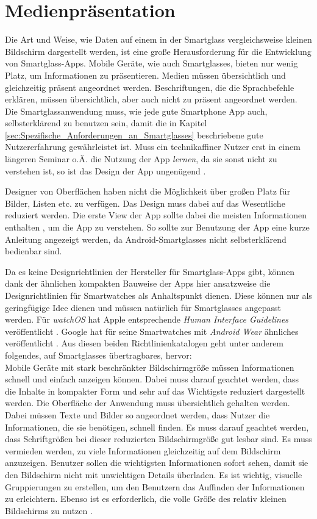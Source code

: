 \section{Medienpräsentation}
\label{sec:Medienpraesentation}
Die Art und Weise, wie Daten auf einem in der Smartglass vergleichsweise kleinen Bildschirm dargestellt werden, ist eine große Herausforderung für die Entwicklung von Smartglass-Apps. Mobile Geräte, wie auch Smartglasses, bieten nur wenig Platz, um Informationen zu präsentieren. Medien müssen übersichtlich und gleichzeitig präsent angeordnet werden. Beschriftungen, die die Sprachbefehle erklären, müssen übersichtlich, aber auch nicht zu präsent angeordnet werden. Die Smartglassanwendung muss, wie jede gute Smartphone App auch, selbsterklärend zu benutzen sein, damit die in Kapitel \ref{sec:Spezifische_Anforderungen_an_Smartglasses} beschriebene gute Nutzererfahrung gewährleistet ist. 
Muss ein technikaffiner Nutzer erst in einem längeren Seminar o.Ä. die Nutzung der App \emph{lernen}, da sie sonst nicht zu verstehen ist, so ist das Design der App ungenügend \cite{Hoober2011} \cite[S.~141ff]{Norman2013}.

Designer von Oberflächen haben nicht die Möglichkeit über großen Platz für Bilder, Listen etc. zu verfügen. Das Design muss dabei auf das Wesentliche reduziert werden. Die erste View der App sollte dabei die meisten Informationen enthalten \cite[S.~442]{Tidwell2005}, um die App zu verstehen. So sollte zur Benutzung der App eine kurze Anleitung angezeigt werden, da Android-Smartglasses nicht selbsterklärend bedienbar sind.

Da es keine Designrichtlinien der Hersteller für Smartglass-Apps gibt, können dank der ähnlichen kompakten Bauweise der Apps hier ansatzweise die Designrichtlinien für Smartwatches als Anhaltspunkt dienen. Diese können nur als geringfügige Idee dienen und müssen natürlich für Smartglasses angepasst werden.
Für \emph{watchOS} hat Apple entsprechende \emph{Human Interface Guidelines} veröffentlicht \cite{Apple2018c}. Google hat für seine Smartwatches mit \emph{Android Wear} ähnliches veröffentlicht \cite{Google2018}. Aus diesen beiden Richtlinienkatalogen geht unter anderem folgendes, auf Smartglasses übertragbares, hervor:
\\
Mobile Geräte mit stark beschränkter Bildschirmgröße  müssen Informationen schnell und einfach anzeigen können. Dabei muss darauf geachtet werden, dass die Inhalte in kompakter Form und sehr auf das Wichtigste reduziert dargestellt werden. Die Oberfläche der Anwendung muss übersichtlich gehalten werden. Dabei müssen Texte und Bilder so angeordnet werden, dass Nutzer die Informationen, die sie benötigen, schnell finden. Es muss darauf geachtet werden, dass Schriftgrößen bei dieser reduzierten Bildschirmgröße gut lesbar sind. Es muss vermieden werden, zu viele Informationen gleichzeitig auf dem Bildschirm anzuzeigen. Benutzer sollen die wichtigsten Informationen sofort sehen, damit sie den Bildschirm nicht mit unwichtigen Details überladen. Es ist wichtig, visuelle Gruppierungen zu erstellen, um den Benutzern das Auffinden der Informationen zu erleichtern. Ebenso ist es erforderlich, die volle Größe des relativ kleinen Bildschirms zu nutzen \cite{Apple2018c, Google2018}.


